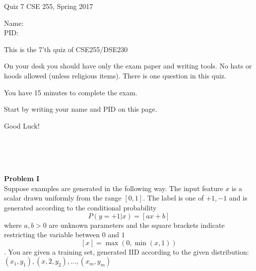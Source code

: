 \documentclass[10pt]{article}
\begin{document}
\setlength\parindent{0pt}
\thispagestyle{empty}

{\textbf \Large Quiz 7} \hfill CSE 255, Spring 2017
\\

\vspace{.1in}

Name: \underline{\hspace{3in}}
\\

PID: \underline{\hspace{3.15in}}

\vspace{.1in}

{\small \setlength\parindent{20pt}This is the 7'th quiz of CSE255/DSE230

On your desk you should have only the exam paper and writing tools.
No hats or hoods allowed (unless religious items).
There is one question in this quiz.

You have 15 minutes to complete the exam.

Start by writing your name and PID on this page.

Good Luck!}\\
\underline{\hspace{6in}}

\newcommand{\uu}{\vec{u}}
\newcommand{\xx}{\vec{x}}
\newcommand{\yy}{\vec{y}}
\newcommand{\vmu}{\vec{\mu}}
~\\
~\\
\noindent
    {\bf Problem I}\\
   Suppose examples are generated in the following way. The input
   feature $x$ is a scalar drawn uniformly from the range
   $[0,1]$. The label is one of ${+1,-1}$ and is generated
   according to the conditional probability
   $$P(y=+1 | x) = \left[ax +b\right]$$ where $a,b>0$ are unknown
   parameters and the square
   brackets indicate restricting the variable between $0$ and $1$
   $$[x] = \max(0,\min(x,1))$$. You are given a training set,
   generated IID according to the given distribution:
   $(x_1,y_1),(x,2,y_2),\ldots,(x_m,y_m)$
\end{document}
